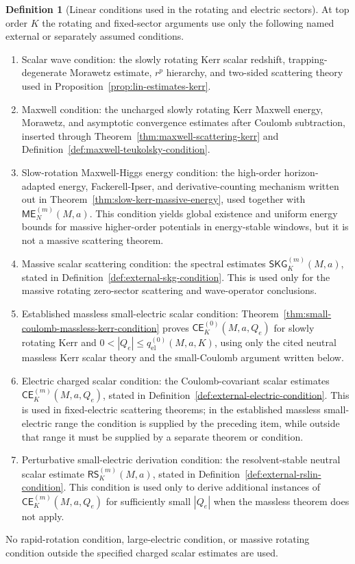 \documentclass[11pt]{article}
\numberwithin{equation}{section}
\theoremstyle{plain}
\theoremstyle{definition}
\newtheorem{definition}{Definition}[section]
\theoremstyle{remark}
\newcommand{\SKG}{\mathsf{SKG}}
\newcommand{\CElec}{\mathsf{CE}}
\newcommand{\RSLin}{\mathsf{RS}}
\newcommand{\ME}{\mathsf{ME}}
\begin{document}
\begin{definition}[Linear conditions used in the rotating and electric sectors]\label{def:rotating-electric-linear-condition-list}
At top order \(K\) the rotating and fixed-sector arguments use only the following named external or separately assumed conditions.
\begin{enumerate}
\item Scalar wave condition: the slowly rotating Kerr scalar redshift, trapping-degenerate Morawetz estimate, \(r^p\) hierarchy, and two-sided scattering theory used in Proposition~\ref{prop:lin-estimates-kerr}.
\item Maxwell condition: the uncharged slowly rotating Kerr Maxwell energy, Morawetz, and asymptotic convergence estimates after Coulomb subtraction, inserted through Theorem~\ref{thm:maxwell-scattering-kerr} and Definition~\ref{def:maxwell-teukolsky-condition}.
\item Slow-rotation Maxwell-Higgs energy condition: the high-order horizon-adapted energy, Fackerell-Ipser, and derivative-counting mechanism written out in Theorem~\ref{thm:slow-kerr-massive-energy}, used together with \(\ME^{(m)}_N(M,a)\).  This condition yields global existence and uniform energy bounds for massive higher-order potentials in energy-stable windows, but it is not a massive scattering theorem.
\item Massive scalar scattering condition: the spectral estimates \(\SKG^{(m)}_K(M,a)\), stated in Definition~\ref{def:external-skg-condition}.  This is used only for the massive rotating zero-sector scattering and wave-operator conclusions.
\item Established massless small-electric scalar condition: Theorem~\ref{thm:small-coulomb-massless-kerr-condition} proves \(\CElec^{(0)}_K(M,a,Q_e)\) for slowly rotating Kerr and \(0<|Q_e|\le q^{(0)}_{\mathrm{el}}(M,a,K)\), using only the cited neutral massless Kerr scalar theory and the small-Coulomb argument written below.
\item Electric charged scalar condition: the Coulomb-covariant scalar estimates \(\CElec^{(m)}_K(M,a,Q_e)\), stated in Definition~\ref{def:external-electric-condition}.  This is used in fixed-electric scattering theorems; in the established massless small-electric range the condition is supplied by the preceding item, while outside that range it must be supplied by a separate theorem or condition.
\item Perturbative small-electric derivation condition: the resolvent-stable neutral scalar estimate \(\RSLin^{(m)}_K(M,a)\), stated in Definition~\ref{def:external-rslin-condition}.  This condition is used only to derive additional instances of \(\CElec^{(m)}_K(M,a,Q_e)\) for sufficiently small \(|Q_e|\) when the massless theorem does not apply.
\end{enumerate}
No rapid-rotation condition, large-electric condition, or massive rotating condition outside the specified charged scalar estimates are used.
\end{definition}
\end{document}
